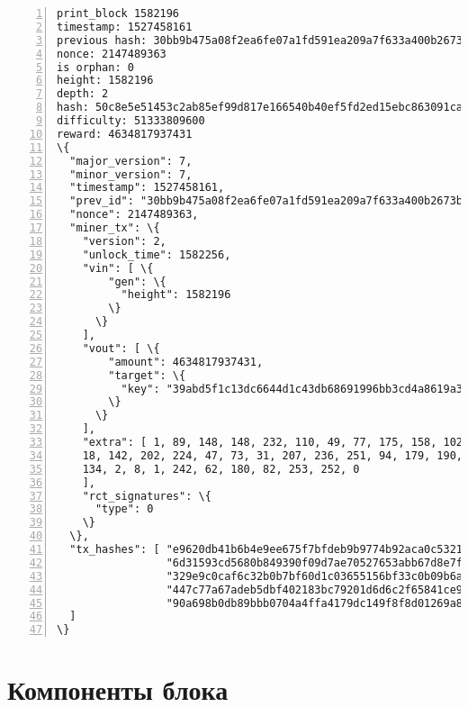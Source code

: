 \begin{appendices}
\begin{Verbatim}[commandchars=\\\{\}, numbers=left]
print_block 1582196
timestamp: 1527458161
previous hash: 30bb9b475a08f2ea6fe07a1fd591ea209a7f633a400b2673b8835a975348b0eb
nonce: 2147489363
is orphan: 0
height: 1582196
depth: 2
hash: 50c8e5e51453c2ab85ef99d817e166540b40ef5fd2ed15ebc863091ca2a04594
difficulty: 51333809600
reward: 4634817937431
\{
  "major_version": 7,
  "minor_version": 7,
  "timestamp": 1527458161,
  "prev_id": "30bb9b475a08f2ea6fe07a1fd591ea209a7f633a400b2673b8835a975348b0eb",
  "nonce": 2147489363,
  "miner_tx": \{
    "version": 2,
    "unlock_time": 1582256,
    "vin": [ \{
        "gen": \{
          "height": 1582196
        \}
      \}
    ],
    "vout": [ \{
        "amount": 4634817937431,
        "target": \{
          "key": "39abd5f1c13dc6644d1c43db68691996bb3cd4a8619a37a227667cf2bf055401"
        \}
      \}
    ],
    "extra": [ 1, 89, 148, 148, 232, 110, 49, 77, 175, 158, 102, 45, 72, 201, 193,
    18, 142, 202, 224, 47, 73, 31, 207, 236, 251, 94, 179, 190, 71, 72, 251, 110, 
    134, 2, 8, 1, 242, 62, 180, 82, 253, 252, 0
    ],
    "rct_signatures": \{
      "type": 0
    \}
  \},
  "tx_hashes": [ "e9620db41b6b4e9ee675f7bfdeb9b9774b92aca0c53219247b8f8c7aecf773ae",
                 "6d31593cd5680b849390f09d7ae70527653abb67d8e7fdca9e0154e5712591bf",
                 "329e9c0caf6c32b0b7bf60d1c03655156bf33c0b09b6a39889c2ff9a24e94a54",
                 "447c77a67adeb5dbf402183bc79201d6d6c2f65841ce95cf03621da5a6bffefc",
                 "90a698b0db89bbb0704a4ffa4179dc149f8f8d01269a85f46ccd7f0007167ee4"
  ]
\}
\end{Verbatim}



\section*{Компоненты блока}


\end{appendices}
